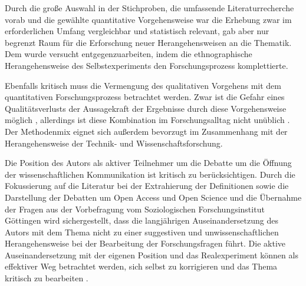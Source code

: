 Durch die große Auswahl in der Stichproben, die umfassende Literaturrecherche vorab und die gewählte quantitative Vorgehensweise war die Erhebung zwar im erforderlichen Umfang vergleichbar und statistisch relevant, gab aber nur begrenzt Raum für die Erforschung neuer Herangehensweisen an die Thematik. Dem wurde versucht entgegenzuarbeiten, indem die ethnographische Herangehensweise des Selbstexperiments den Forschungsprozess komplettierte.

Ebenfalls kritisch muss die Vermengung des qualitativen Vorgehens mit dem quantitativen Forschungsprozess betrachtet werden. Zwar ist die Gefahr eines Qualitätsverlusts der Aussagekraft der Ergebnisse durch diese Vorgehensweise möglich \cite{suchen_Lamek_1993_S_198}, allerdings ist diese Kombination im Forschungsalltag nicht unüblich \cite{bortz_Doering_2006_Methoden}. Der Methodenmix eignet sich außerdem bevorzugt im Zusammenhang mit der Herangehensweise der Technik- und Wissenschaftsforschung.

Die Position des Autors als aktiver Teilnehmer um die Debatte um die Öffnung der wissenschaftlichen Kommunikation ist kritisch zu berücksichtigen. Durch die Fokussierung auf die Literatur bei der Extrahierung der Definitionen sowie die Darstellung der Debatten um Open Access und Open Science und die Übernahme der Fragen aus der Vorbefragung vom Soziologischen Forschungsinstitut Göttingen wird sichergestellt, dass die langjährigen Auseinandersetzung des Autors mit dem Thema nicht zu einer suggestiven und unwissenschaftlichen Herangehensweise bei der Bearbeitung der Forschungsfragen führt. Die aktive Auseinandersetzung mit der eigenen Position und das Realexperiment können als effektiver Weg betrachtet werden, sich selbst zu korrigieren und das Thema kritisch zu bearbeiten \cite{Krohn_2005}.

